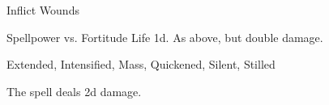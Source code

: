 \begin{spellsection}{Inflict Wounds}
\begin{spellcontent}
\begin{spelltargetinginfo}
\end{spelltargetinginfo}
\begin{spelleffects}
\begin{spellattack}{Spellpower vs. Fortitude}
\spellsuccess Life  \plus1d.
\spellcritical As above, but double damage.
\end{spellattack}
\end{spelleffects}
\end{spellcontent}
\begin{spellfooter}
 Extended, Intensified, Mass, Quickened, Silent, Stilled
\end{spellfooter}
\begin{spellsubcontent}
\begin{spellcantrip}
The spell deals \minus2d damage.
\end{spellcantrip}
\end{spellsubcontent}
\end{spellsection}
